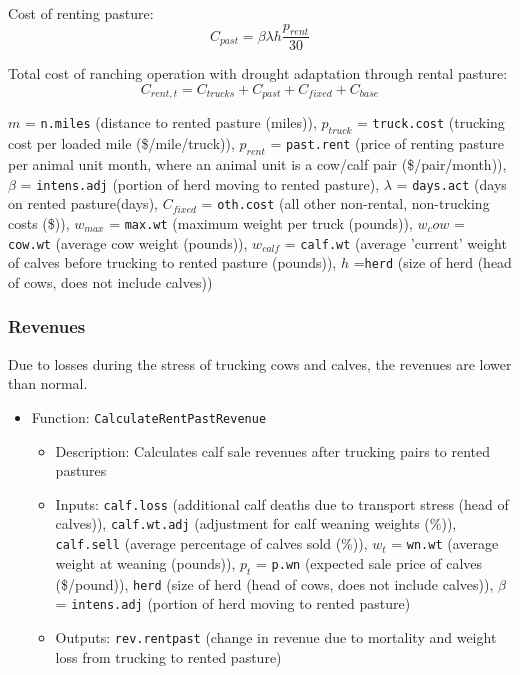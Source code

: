 \documentclass[11pt]{article}
\begin{document}
Cost of renting pasture:
\begin{equation}
C_{past} = \beta \lambda h  \frac{p_{rent}}{30} 
\end{equation}

Total cost of ranching operation with drought adaptation through rental pasture:
\begin{equation}
C_{rent,t} = C_{trucks} + C_{past} + C_{fixed} + C_{base}
\end{equation}

$m$ = \verb!n.miles! (distance to rented pasture (miles)), $p_{truck}$ = \verb!truck.cost! (trucking cost per loaded mile (\$/mile/truck)), $p_{rent}$ = \verb!past.rent! (price of renting pasture per animal unit month, where an animal unit is a cow/calf pair (\$/pair/month)), $\beta$ = \verb!intens.adj! (portion of herd moving to rented pasture), $\lambda$ = \verb!days.act! (days on rented pasture(days), $C_{fixed}$ = \verb!oth.cost! (all other non-rental, non-trucking costs (\$)), $w_{max}$ = \verb!max.wt! (maximum weight per truck (pounds)), $w_cow$ = \verb!cow.wt! (average cow weight (pounds)), $w_{calf}$ = \verb!calf.wt! (average 'current' weight of calves before trucking to rented pasture (pounds)), $h$ =\verb!herd! (size of herd (head of cows, does not include calves))

\subsubsection{Revenues}
Due to losses during the stress of trucking cows and calves, the revenues are lower than normal.

\begin{itemize}
\item Function: \verb!CalculateRentPastRevenue!
	\begin{itemize}
	\item Description: Calculates calf sale revenues after trucking pairs to rented pastures
	\item Inputs: \verb!calf.loss! (additional calf deaths due to transport stress (head of calves)), \verb!calf.wt.adj! (adjustment for calf weaning weights (\%)), \verb!calf.sell! (average percentage of calves sold (\%)), $w_t$ = \verb!wn.wt! (average weight at weaning (pounds)), $p_t$ = \verb!p.wn! (expected sale price of calves (\$/pound)), \verb!herd! (size of herd (head of cows, does not include calves)), $\beta$ = \verb!intens.adj! (portion of herd moving to rented pasture)
  \item Outputs: \verb!rev.rentpast! (change in revenue due to mortality and weight loss from trucking to rented pasture)
	\end{itemize}
\end{itemize}	 
\end{document}

